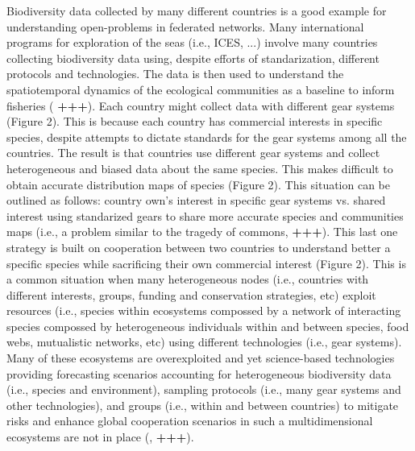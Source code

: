 \documentclass[11pt, a4paper]{article} %
\begin{document}
Biodiversity data collected by many different countries is a good
example for understanding open-problems in federated networks. Many
international programs for exploration of the seas (i.e., ICES, ...)
involve many countries collecting biodiversity data using, despite
efforts of standarization, different protocols and technologies. The
data is then used to understand the spatiotemporal dynamics of the
ecological communities as a baseline to inform fisheries ({\bf
  +++}). Each country might collect data with different gear systems
(Figure 2). This is because each country has commercial interests in
specific species, despite attempts to dictate standards for the gear
systems among all the countries. The result is that countries use
different gear systems and collect heterogeneous and biased data about
the same species. This makes difficult to obtain accurate distribution
maps of species (Figure 2). This situation can be outlined as follows:
country own's interest in specific gear systems vs. shared interest
using standarized gears to share more accurate species and communities
maps (i.e., a problem similar to the tragedy of commons, {\bf
  +++}). This last one strategy is built on cooperation between two
countries to understand better a specific species while sacrificing
their own commercial interest (Figure 2). This is a common situation
when many heterogeneous nodes (i.e., countries with different
interests, groups, funding and conservation strategies, etc) exploit
resources (i.e., species within ecosystems compossed by a network of
interacting species compossed by heterogeneous individuals within and
between species, food webs, mutualistic networks, etc) using different
technologies (i.e., gear systems). Many of these ecosystems are
overexploited and yet science-based technologies providing forecasting
scenarios accounting for heterogeneous biodiversity data (i.e.,
species and environment), sampling protocols (i.e., many gear systems
and other technologies), and groups (i.e., within and between
countries) to mitigate risks and enhance global cooperation scenarios
in such a multidimensional ecosystems are not in place
(\citep{Wilson2018}, {\bf +++}).
\end{document}
